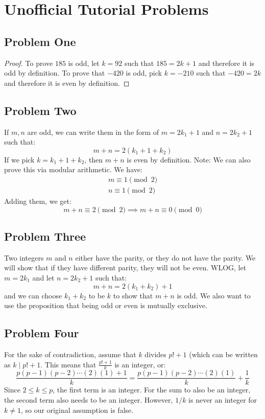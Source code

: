 \documentclass{article}
\newcommand{\divides}{\mid}
\begin{document}
\section{Unofficial Tutorial Problems}
\subsection*{Problem One}
\begin{proof}
    To prove $185$ is odd, let $k=92$ such that $185=2k+1$ and therefore it is odd by definition. To prove that $-420$ is odd, pick $k=-210$ such that $-420=2k$ and therefore it is even by definition.
\end{proof}
\subsection*{Problem Two}
If $m,n$ are odd, we can write them in the form of $m=2k_1+1$ and $n=2k_2+1$ such that:
\begin{equation}
    m+n = 2(k_1+1+k_2)
\end{equation}
If we pick $k=k_1+1+k_2$, then $m+n$ is even by definition.
Note: We can also prove this via modular arithmetic. We have:
\begin{align*}
    m \equiv 1 \pmod{2} \\ 
    n \equiv 1 \pmod{2}
\end{align*}
Adding them, we get:
\begin{equation*}
    m+n \equiv 2\pmod{2} \implies m+n \equiv 0 \pmod{0}
\end{equation*}
\subsection*{Problem Three}
Two integers $m$ and $n$ either have the parity, or they do not have the parity. We will show that if they have different parity, they will not be even. WLOG, let $m=2k_1$ and let $n=2k_2+1$ such that:
\begin{equation*}
    m+n = 2(k_1+k_2)+1
\end{equation*}
and we can choose $k_1+k_2$ to be $k$ to show that $m+n$ is odd. We also want to use the proposition that being odd or even is mutually exclusive.
\subsection*{Problem Four}
For the sake of contradiction, assume that $k$ divides $p! + 1$ (which can be written as $k \divides p! + 1$. This means that $\frac{p!+1}{k}$ is an integer, or:
\begin{equation*}
    \frac{p(p-1)(p-2)\cdots (2)(1) + 1}{k} = \frac{p(p-1)(p-2)\cdots (2)(1)}{k} + \frac{1}{k}
\end{equation*}
Since $2 \le k \le p$, the first term is an integer. For the sum to also be an integer, the second term also needs to be an integer. However, $1/k$ is never an integer for $k \neq 1$, so our original assumption is false.
\end{document}
